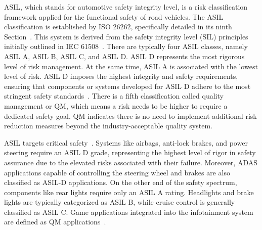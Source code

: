     ASIL, which stands for automotive safety integrity level, is a risk classification framework applied for the functional safety of road vehicles. The ASIL classification is established by ISO 26262, specifically detailed in its ninth Section~\cite{iso26262}. This system is derived from the safety integrity level (SIL) principles initially outlined in IEC 61508~\cite{IEC61508}.
    There are typically four ASIL classes, namely ASIL A, ASIL B, ASIL C, and ASIL D. ASIL D represents the most rigorous level of risk management. At the same time, ASIL A is associated with the lowest level of risk. ASIL D imposes the highest integrity and safety requirements, ensuring that components or systems developed for ASIL D adhere to the most stringent safety standards~\cite{iso26262,9565115}.
    There is a fifth classification called quality management or QM, which means a risk needs to be higher to require a dedicated safety goal. QM indicates there is no need to implement additional risk reduction measures beyond the industry-acceptable quality system. 
    
    ASIL targets critical safety~\cite{iso26262,askaripoor2022architecture,askaripoor2023designer}. 
    Systems like airbags, anti-lock brakes, and power steering require an ASIL D grade, representing the highest level of rigor in safety assurance due to the elevated risks associated with their failure. Moreover, ADAS applications capable of controlling the steering wheel and brakes are also classified as ASIL-D applications.               
    On the other end of the safety spectrum, components like rear lights require only an ASIL A rating. Headlights and brake lights are typically categorized as ASIL B, while cruise control is generally classified as ASIL C. Game applications integrated into the infotainment system are defined as QM applications~\cite{ASIL}.                       
                            
